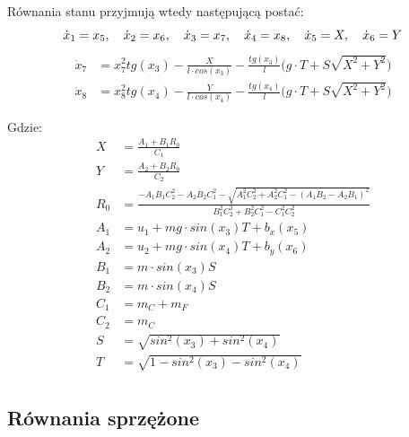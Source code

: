 \documentclass[10pt]{article}
\begin{document}
Równania stanu przyjmują wtedy następującą postać:
\begin{equation}
\dot{x}_1 = x_5, \quad
\dot{x}_2 = x_6, \quad
\dot{x}_3 = x_7, \quad
\dot{x}_4 = x_8, \quad
\dot{x}_5 = X, \quad
\dot{x}_6 = Y \\
\end{equation}
\begin{equation}
\begin{split}
\dot{x}_7 &= x_7^2 tg(x_3) - \frac{X}{l \cdot cos(x_3)} - \frac{tg(x_3)}{l} \Big( g \cdot T + S\sqrt{X^2 + Y^2} \Big) \\
\dot{x}_8 &= x_8^2 tg(x_4) - \frac{Y}{l \cdot cos(x_4)} - \frac{tg(x_4)}{l} \Big( g \cdot T + S\sqrt{X^2 + Y^2} \Big)
\end{split}
\end{equation}

Gdzie:
\begin{equation}
\begin{split}
X &= \frac{A_1 + B_1 R_0}{C_1} \\
Y &= \frac{A_2 + B_2 R_0}{C_2} \\
R_0 &= \frac{-A_1B_1C_2^2 -A_2B_2C_1^2 - 
\sqrt{A_1^2C_2^2 + A_2^2C_1^2 - ( A_1B_2 - A_2B_1)^2}}
{B_1^2C_2^2 + B_2^2C_1^2 - C_1^2C_2^2} \\
A_1 &= u_1 + mg \cdot sin(x_3)T + b_x(x_5) \\
A_2 &= u_2 + mg \cdot sin(x_4)T + b_y(x_6) \\
B_1 &= m \cdot sin(x_3) S \\
B_2 &= m \cdot sin(x_4) S \\
C_1 &= m_C + m_F \\
C_2 &= m_C \\
S &= \sqrt{ sin^2(x_3) + sin^2(x_4) } \\
T &= \sqrt{1 - sin^2(x_3) - sin^2(x_4) } \\
\end{split}
\end{equation}

\newpage
\subsection*{Równania sprzężone}

\end{document}
